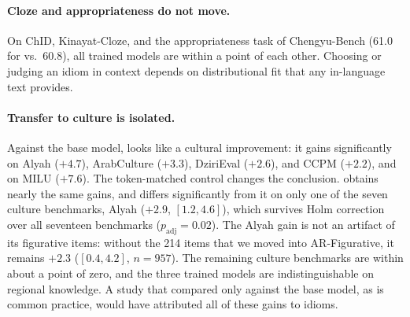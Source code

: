\paragraph{Cloze and appropriateness do not move.}
On ChID, Kinayat-Cloze, and the appropriateness task of Chengyu-Bench (61.0 for \random{} vs.\ 60.8), all trained models are within a point of each other. Choosing or judging an idiom in context depends on distributional fit that any in-language text provides.

\paragraph{Transfer to culture is isolated.}
Against the base model, \idiomcpt{} looks like a cultural improvement: it gains significantly on Alyah ($+4.7$), ArabCulture ($+3.3$), DziriEval ($+2.6$), and CCPM ($+2.2$), and on MILU ($+7.6$). The token-matched control changes the conclusion. \random{} obtains nearly the same gains, and \idiomcpt{} differs significantly from it on only one of the seven culture benchmarks, Alyah ($+2.9$, $[1.2, 4.6]$), which survives Holm correction over all seventeen benchmarks ($p_{\text{adj}}{=}0.02$). The Alyah gain is not an artifact of its figurative items: without the 214 items that we moved into AR-Figurative, it remains $+2.3$ ($[0.4, 4.2]$, $n{=}957$). The remaining culture benchmarks are within about a point of zero, and the three trained models are indistinguishable on regional knowledge. A study that compared only against the base model, as is common practice, would have attributed all of these gains to idioms.



